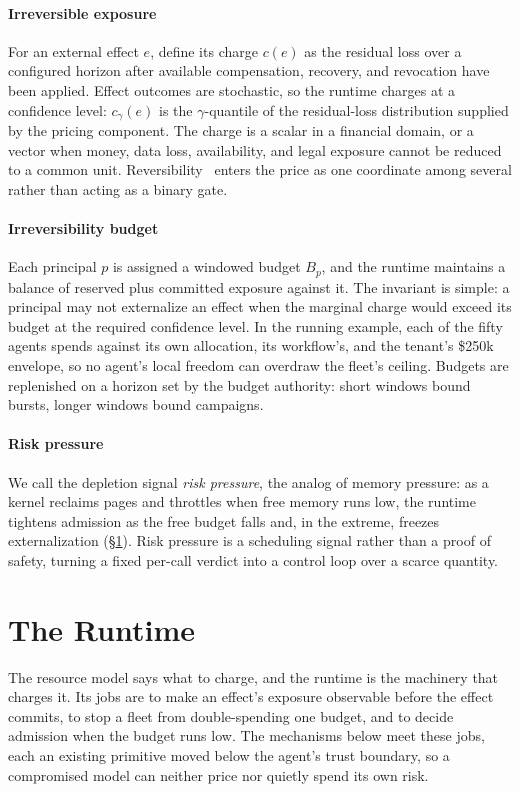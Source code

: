 \documentclass[sigconf]{acmart}
\begin{document}
\paragraph{Irreversible exposure} For an external effect $e$, define its charge $c(e)$ as the residual loss over a configured horizon after available compensation, recovery, and revocation have been applied. Effect outcomes are stochastic, so the runtime charges at a confidence level: $c_\gamma(e)$ is the $\gamma$-quantile of the residual-loss distribution supplied by the pricing component. The charge is a scalar in a financial domain, or a vector when money, data loss, availability, and legal exposure cannot be reduced to a common unit. Reversibility~\cite{GarciaMolina1987Sagas} enters the price as one coordinate among several rather than acting as a binary gate.

\paragraph{Irreversibility budget} Each principal $p$ is assigned a windowed budget $B_p$, and the runtime maintains a balance of reserved plus committed exposure against it. The invariant is simple: a principal may not externalize an effect when the marginal charge would exceed its budget at the required confidence level. In the running example, each of the fifty agents spends against its own allocation, its workflow's, and the tenant's \$250k envelope, so no agent's local freedom can overdraw the fleet's ceiling. Budgets are replenished on a horizon set by the budget authority: short windows bound bursts, longer windows bound campaigns.

\paragraph{Risk pressure} We call the depletion signal \emph{risk pressure}, the analog of memory pressure: as a kernel reclaims pages and throttles when free memory runs low, the runtime tightens admission as the free budget falls and, in the extreme, freezes externalization (\S\ref{sec:runtime}). Risk pressure is a scheduling signal rather than a proof of safety, turning a fixed per-call verdict into a control loop over a scarce quantity.

\section{The Runtime}
\label{sec:runtime}
The resource model says what to charge, and the runtime is the machinery that charges it. Its jobs are to make an effect's exposure observable before the effect commits, to stop a fleet from double-spending one budget, and to decide admission when the budget runs low. The mechanisms below meet these jobs, each an existing primitive moved below the agent's trust boundary, so a compromised model can neither price nor quietly spend its own risk.
\end{document}
